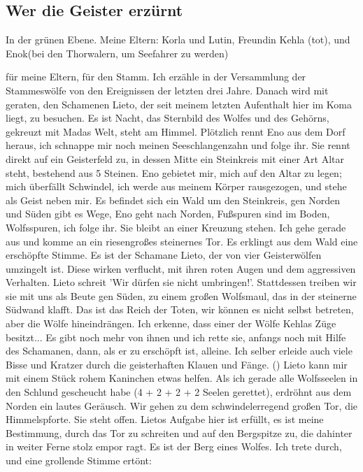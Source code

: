 
\subsection{Wer die Geister erzürnt}
\label{sec:interemezzo}
In der grünen Ebene. Meine Eltern: Korla und Lutin, Freundin Kehla (tot), und Enok(bei den Thorwalern, um Seefahrer zu werden) 

 für meine Eltern,  für den Stamm. Ich erzähle in der Versammlung der Stammeswölfe von den Ereignissen der letzten drei Jahre. Danach wird mit geraten, den Schamenen Lieto, der seit meinem letzten Aufenthalt hier im Koma liegt, zu besuchen. Es ist Nacht, das Sternbild des Wolfes und des Gehörns, gekreuzt mit Madas Welt, steht am Himmel. Plötzlich rennt Eno aus dem Dorf heraus, ich schnappe mir noch meinen Seeschlangenzahn und folge ihr. Sie rennt direkt auf ein Geisterfeld zu, in dessen Mitte ein Steinkreis mit einer Art Altar steht, bestehend aus 5 Steinen. Eno gebietet mir, mich auf den Altar zu legen; mich überfällt Schwindel, ich werde aus meinem Körper rausgezogen, und stehe als Geist neben mir. Es befindet sich ein Wald um den Steinkreis, gen Norden und Süden gibt es Wege, Eno geht nach Norden, Fußspuren sind im Boden, Wolfsspuren, ich folge ihr. Sie bleibt an einer Kreuzung stehen. Ich gehe gerade aus und komme an ein riesengroßes steinernes Tor. Es erklingt aus dem Wald eine erschöpfte Stimme. Es ist der Schamane Lieto, der von vier Geisterwölfen umzingelt ist. Diese wirken verflucht, mit ihren roten Augen und dem aggressiven Verhalten. Lieto schreit 'Wir dürfen sie nicht umbringen!'. Stattdessen treiben wir sie mit uns als Beute gen Süden, zu einem großen Wolfsmaul, das in der steinerne Südwand klafft. Das ist das Reich der Toten, wir können es nicht selbst betreten, aber die Wölfe hineindrängen. Ich erkenne, dass einer der Wölfe Kehlas Züge besitzt... Es gibt noch mehr von ihnen und ich rette sie, anfangs noch mit Hilfe des Schamanen, dann, als er zu erschöpft ist, alleine. Ich selber erleide auch viele Bisse und Kratzer durch die geisterhaften Klauen und Fänge. () Lieto kann mir mit einem Stück rohem Kaninchen etwas helfen. Als ich gerade alle Wolfsseelen in den Schlund gescheucht habe (4 + 2 + 2 + 2 Seelen gerettet), erdröhnt aus dem Norden ein lautes Geräusch. Wir gehen zu dem schwindelerregend großen Tor, die Himmelspforte. Sie steht offen. Lietos Aufgabe hier ist erfüllt, es ist meine Bestimmung, durch das Tor zu schreiten und auf den Bergspitze zu, die dahinter in weiter Ferne stolz empor ragt. Es ist der Berg eines Wolfes. Ich trete durch, und eine grollende Stimme ertönt: 

